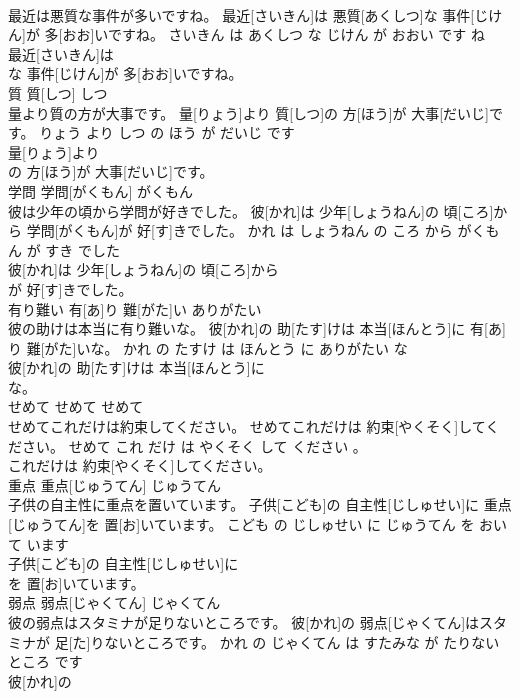\documentclass[8pt]{extreport}
\begin{document}
\begin{CJK}{UTF8}{min}
\\	最近は悪質な事件が多いですね。	最近[さいきん]は 悪質[あくしつ]な 事件[じけん]が 多[おお]いですね。	さいきん は あくしつ な じけん が おおい です ね	
\\	最近[さいきん]は
\\	な 事件[じけん]が 多[おお]いですね。			
\\	質	質[しつ]	しつ	
\\	量より質の方が大事です。	量[りょう]より 質[しつ]の 方[ほう]が 大事[だいじ]です。	りょう より しつ の ほう が だいじ です	
\\	量[りょう]より
\\	の 方[ほう]が 大事[だいじ]です。			
\\	学問	学問[がくもん]	がくもん	
\\	彼は少年の頃から学問が好きでした。	彼[かれ]は 少年[しょうねん]の 頃[ころ]から 学問[がくもん]が 好[す]きでした。	かれ は しょうねん の ころ から がくもん が すき でした	
\\	彼[かれ]は 少年[しょうねん]の 頃[ころ]から
\\	が 好[す]きでした。			
\\	有り難い	有[あ]り 難[がた]い	ありがたい	
\\	彼の助けは本当に有り難いな。	彼[かれ]の 助[たす]けは 本当[ほんとう]に 有[あ]り 難[がた]いな。	かれ の たすけ は ほんとう に ありがたい な	
\\	彼[かれ]の 助[たす]けは 本当[ほんとう]に
\\	な。			
\\	せめて	せめて	せめて	
\\	せめてこれだけは約束してください。	せめてこれだけは 約束[やくそく]してください。	せめて これ だけ は やくそく して ください 。	
\\	これだけは 約束[やくそく]してください。			
\\	重点	重点[じゅうてん]	じゅうてん	
\\	子供の自主性に重点を置いています。	子供[こども]の 自主性[じしゅせい]に 重点[じゅうてん]を 置[お]いています。	こども の じしゅせい に じゅうてん を おいて います	
\\	子供[こども]の 自主性[じしゅせい]に
\\	を 置[お]いています。			
\\	弱点	弱点[じゃくてん]	じゃくてん	
\\	彼の弱点はスタミナが足りないところです。	彼[かれ]の 弱点[じゃくてん]はスタミナが 足[た]りないところです。	かれ の じゃくてん は すたみな が たりない ところ です	
\\	彼[かれ]の

\end{CJK}
\end{document}
